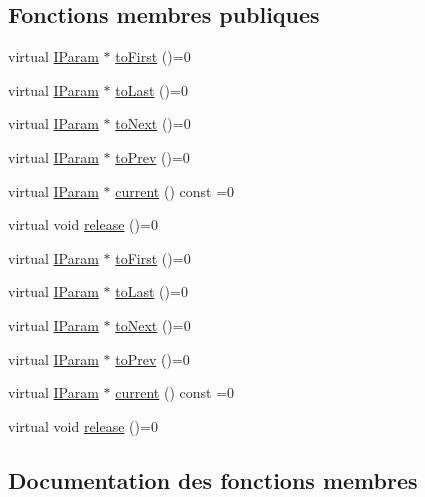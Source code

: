 \subsection*{Fonctions membres publiques}
\begin{DoxyCompactItemize}
\item 
virtual \hyperlink{class_i_param}{I\+Param} $\ast$ \hyperlink{class_i_param_iterator_add7ed032ac2e0fca47f4cf2e7a2f09f1}{to\+First} ()=0
\item 
virtual \hyperlink{class_i_param}{I\+Param} $\ast$ \hyperlink{class_i_param_iterator_a3d22fab0888c7eeff05d860761543718}{to\+Last} ()=0
\item 
virtual \hyperlink{class_i_param}{I\+Param} $\ast$ \hyperlink{class_i_param_iterator_a6ea3f956cba6822efd7451690b0cafeb}{to\+Next} ()=0
\item 
virtual \hyperlink{class_i_param}{I\+Param} $\ast$ \hyperlink{class_i_param_iterator_a78fe90dc8543b093e41d87e13a0ac594}{to\+Prev} ()=0
\item 
virtual \hyperlink{class_i_param}{I\+Param} $\ast$ \hyperlink{class_i_param_iterator_a1923ca80a2bb8b62fcadd872fdadf761}{current} () const  =0
\item 
virtual void \hyperlink{class_i_param_iterator_a3a68af5122ed250f957922e219329ad1}{release} ()=0
\item 
virtual \hyperlink{class_i_param}{I\+Param} $\ast$ \hyperlink{class_i_param_iterator_add7ed032ac2e0fca47f4cf2e7a2f09f1}{to\+First} ()=0
\item 
virtual \hyperlink{class_i_param}{I\+Param} $\ast$ \hyperlink{class_i_param_iterator_a3d22fab0888c7eeff05d860761543718}{to\+Last} ()=0
\item 
virtual \hyperlink{class_i_param}{I\+Param} $\ast$ \hyperlink{class_i_param_iterator_a6ea3f956cba6822efd7451690b0cafeb}{to\+Next} ()=0
\item 
virtual \hyperlink{class_i_param}{I\+Param} $\ast$ \hyperlink{class_i_param_iterator_a78fe90dc8543b093e41d87e13a0ac594}{to\+Prev} ()=0
\item 
virtual \hyperlink{class_i_param}{I\+Param} $\ast$ \hyperlink{class_i_param_iterator_a1923ca80a2bb8b62fcadd872fdadf761}{current} () const  =0
\item 
virtual void \hyperlink{class_i_param_iterator_a3a68af5122ed250f957922e219329ad1}{release} ()=0
\end{DoxyCompactItemize}


\subsection{Documentation des fonctions membres}
\hypertarget{class_i_param_iterator_a1923ca80a2bb8b62fcadd872fdadf761}{}
